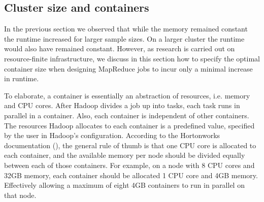 \documentclass{bioinfo}
\begin{document}

\subsection*{Cluster size and containers}
In the previous section we observed that while the memory remained constant the runtime increased for larger sample sizes. 
On a larger cluster the runtime would also have remained constant. 
However, as research is carried out on resource-finite infrastructure, we discuss in this section how to specify the optimal container size when designing MapReduce jobs to incur only a minimal increase in runtime. 

To elaborate, a container is essentially an abstraction of resources, i.e. memory and CPU cores. 
After Hadoop divides a job up into tasks, each task runs in parallel in a container. Also, each container is independent of other containers.
The resources Hadoop allocates to each container is a predefined value, specified by the user in Hadoop's configuration. 
According to the Hortonworks documentation (\cite{Horton2013}), the general rule of thumb is that one CPU core is allocated to each container, and the available memory per node should be divided equally between each of those containers. 
For example, on a node with 8 CPU cores and 32GB memory, each container should be allocated 1 CPU core and 4GB memory. Effectively allowing a maximum of eight 4GB containers to run in parallel on that node.
\end{document}

